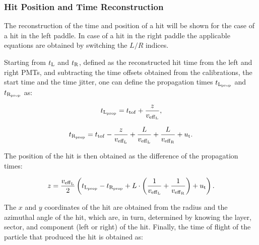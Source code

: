 %
%

\subsubsection{Hit Position and Time Reconstruction}

The reconstruction of the time and position of a hit will be shown for the case of a hit in the left paddle. In
case of a hit in the right paddle the applicable equations are obtained by switching the $L/R$ indices.

Starting from $t_{\rm{L}}$ and $t_{\rm{R}}$, defined as the reconstructed hit time from the left and right PMTs,
and subtracting the time offsets obtained from the calibrations, the start time and the time jitter, one can
define the propagation times $t_{\rm{L}_{\rm{prop}}}$ and $t_{\rm{R}_{\rm{prop}}}$ as:

\begin{equation}
t_{\rm{L}_{\rm{prop}}}=t_{\rm{tof}}+\frac{z}{v_{\rm{eff}_{\rm{L}}}},
\end{equation}

\begin{equation}
t_{\rm{R}_{\rm{prop}}}=t_{\rm{tof}}-\frac{z}{v_{\rm{eff}_{\rm{L}}}}+\frac{L}{v_{\rm{eff}_{\rm{L}}}}
+\frac{L}{v_{\rm{eff}_{\rm{R}}}}+u_{\rm{t}}.
\end{equation}

The position of the hit is then obtained as the difference of the propagation times:

\begin{equation}
z=\frac{v_{\rm{eff}_{\rm{L}}}}{2} \left(t_{\rm{L}_{\rm{prop}}}-t_{\rm{R}_{\rm{prop}}}
+ L \cdot \left(\frac{1}{v_{\rm{eff}_{\rm{L}}}}+\frac{1}{v_{\rm{eff}_{\rm{R}}}}\right)  +u_{\rm{t}}\right).
\end{equation}

The $x$ and $y$ coordinates of the hit are obtained from the radius and the azimuthal angle of the hit, which
are, in turn, determined by knowing the layer, sector, and component (left or right) of the hit.  Finally, the time
of flight of the particle that produced the hit is obtained as:

